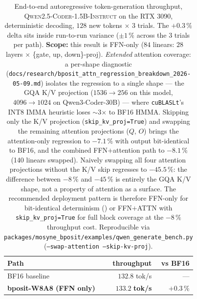 \documentclass[11pt,a4paper]{article}
\begin{document}
\begin{table}[h]
\centering
\begin{tabular}{@{}lrr@{}}
\toprule
Path                              & throughput      & vs BF16 \\
\midrule
BF16 baseline                     & $132.8$ tok/s   & ---     \\
\textbf{bposit-W8A8 (FFN only)}   & $\mathbf{133.2}$ \textbf{tok/s} & $\mathbf{+0.3\,\%}$ \\
\bottomrule
\end{tabular}
\caption{End-to-end autoregressive token-generation throughput,
\textsc{Qwen2.5-Coder-1.5B-Instruct} on the RTX 3090, deterministic
decoding, $128$ new tokens $\times$ $3$ trials. The $+0.3\,\%$ delta
sits inside run-to-run variance ($\pm 1\,\%$ across the $3$ trials per
path). \textbf{Scope:} this result is FFN-only ($84$ linears: $28$
layers $\times$ \{gate, up, down\}-proj). \emph{Extended} attention
coverage: a per-shape diagnostic
(\texttt{docs/research/bposit\_attn\_regression\_breakdown\_2026-05-09.md})
isolates the regression to a single shape --- the GQA K/V projection
($1536\to 256$ on this model, $4096\to 1024$ on Qwen3-Coder-30B) ---
where \texttt{cuBLASLt}'s INT8 IMMA heuristic loses $\sim$3$\times$ to
BF16 HMMA. Skipping only the K/V projection
(\texttt{skip\_kv\_proj=True}) and swapping the remaining attention
projections ($Q$, $O$) brings the attention-only regression to
$-7.1\,\%$ with output bit-identical to BF16, and the combined
FFN$+$attention path to $-8.1\,\%$ (140 linears swapped). Naively
swapping all four attention projections without the K/V skip
regresses to $-45.5\,\%$: the difference between $-8\,\%$ and $-45\,\%$
is entirely the GQA K/V shape, not a property of attention as a
surface. The recommended deployment pattern is therefore FFN-only for
bit-identical determinism () or FFN$+$ATTN with
\texttt{skip\_kv\_proj=True} for full block coverage at the
$-8\,\%$ throughput cost. Reproducible via
\texttt{packages/mosyne\_bposit/examples/qwen\_generate\_bench.py}
(\texttt{--swap-attention --skip-kv-proj}).}
\label{tab:e2e}
\end{table}
\end{document}
